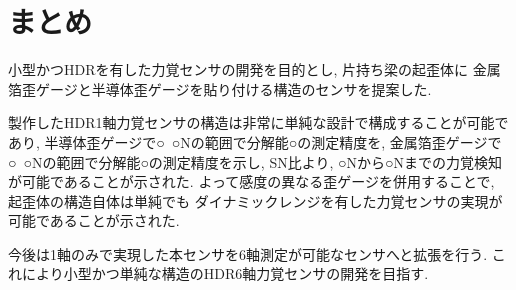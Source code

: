 \section{まとめ}
小型かつHDRを有した力覚センサの開発を目的とし, 片持ち梁の起歪体に
金属箔歪ゲージと半導体歪ゲージを貼り付ける構造のセンサを提案した. 

製作したHDR1軸力覚センサの構造は非常に単純な設計で構成することが可能であり, 
半導体歪ゲージで○~○Nの範囲で分解能○の測定精度を, 
金属箔歪ゲージで○~○Nの範囲で分解能○の測定精度を示し, 
SN比より, ○Nから○Nまでの力覚検知が可能であることが示された.  
よって感度の異なる歪ゲージを併用することで, 起歪体の構造自体は単純でも
ダイナミックレンジを有した力覚センサの実現が可能であることが示された. 

今後は1軸のみで実現した本センサを6軸測定が可能なセンサへと拡張を行う. 
これにより小型かつ単純な構造のHDR6軸力覚センサの開発を目指す.